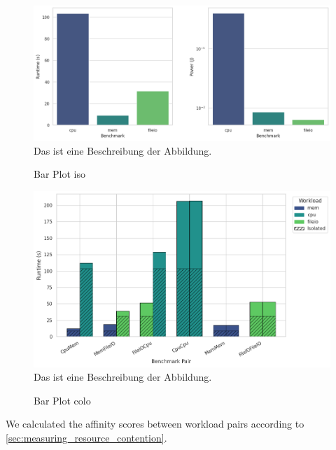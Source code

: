 \begin{figure}[H]
    \caption{Bar Plot iso}
    \includegraphics[scale=0.5]{fig/06/06-barplot-iso-bench.png}
    \label{fig:bar_plot_iso_bench}
    \newline
    \tiny
    Das ist eine Beschreibung der Abbildung.
\end{figure}
\begin{figure}[H]
    \caption{Bar Plot colo}
    \includegraphics[scale=0.5]{fig/06/06-barplot-colo-bench.png}
    \label{fig:bar_plot_colo_bench}
    \newline
    \tiny
    Das ist eine Beschreibung der Abbildung.
\end{figure}

We calculated the affinity scores between workload pairs according to \ref{sec:measuring_resource_contention}.

